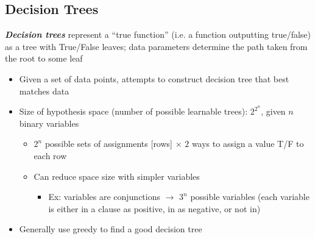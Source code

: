 \documentclass[12pt]{extarticle}
\theoremstyle{definition}
\theoremstyle{remark}
\newcommand{\pstart}[0]{\noindent}
\newcommand{\term}[1]{\noindent\textbf{\textit{#1}}}
\begin{document}
\subsection{Decision Trees}
\pstart
\term{Decision trees} represent a ``true function'' (i.e. a function outputting true/false) as a tree with True/False leaves; data parameters determine the path taken from the root to some leaf \begin{itemize}
    \item Given a set of data points, attempts to construct decision tree that best matches data
    \item Size of hypothesis space (number of possible learnable trees): \ul{$2^{2^n}$}, given $n$ binary variables \begin{itemize}
        \item $2^n$ possible sets of assignments [rows] $\times$ $2$ ways to assign a value T/F to each row
        \item Can reduce space size with simpler variables \begin{itemize}
            \item Ex: variables are conjunctions $\to$ $3^n$ possible variables (each variable is either in a clause as positive, in as negative, or not in)
        \end{itemize}
    \end{itemize}
    \item Generally use greedy to find a good decision tree
\end{itemize}
\end{document}
